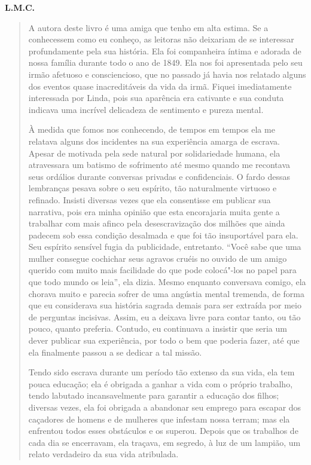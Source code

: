 \textbf{L.M.C.}

\begin{quote}
A autora deste livro é uma amiga que
tenho em alta estima. Se a conhecessem como eu conheço, as leitoras não
deixariam de se interessar profundamente pela sua história. Ela foi
companheira íntima e adorada de nossa família durante todo o ano de
1849. Ela nos foi apresentada pelo seu irmão afetuoso e consciencioso,
que no passado já havia nos relatado alguns dos eventos quase
inacreditáveis da vida da irmã. Fiquei imediatamente interessada por
Linda, pois sua aparência era cativante e sua conduta indicava uma
incrível delicadeza de sentimento e pureza mental.

À medida que fomos nos conhecendo, de
tempos em tempos ela me relatava alguns dos incidentes na sua
experiência amarga de escrava. Apesar de motivada pela sede natural por
solidariedade humana, ela atravessara um batismo de sofrimento até mesmo
quando me recontava seus ordálios durante conversas privadas e
confidenciais. O fardo dessas lembranças pesava sobre o seu espírito,
tão naturalmente virtuoso e refinado. Insisti diversas vezes que ela
consentisse em publicar sua narrativa, pois era minha opinião que esta
encorajaria muita gente a trabalhar com mais afinco pela desescravização
dos milhões que ainda padecem sob essa condição desalmada e que foi tão
insuportável para ela. Seu espírito sensível fugia da publicidade,
entretanto. ``Você sabe que uma mulher consegue cochichar seus agravos
cruéis no ouvido de um amigo querido com muito mais facilidade do que
pode colocá"-los no papel para que todo mundo os leia'', ela dizia. Mesmo
enquanto conversava comigo, ela chorava muito e parecia sofrer de uma
angústia mental tremenda, de forma que eu considerava sua história
sagrada demais para ser extraída por meio de perguntas incisivas. Assim,
eu a deixava livre para contar tanto, ou tão pouco, quanto preferia.
Contudo, eu continuava a insistir que seria um dever publicar sua
experiência, por todo o bem que poderia fazer, até que ela finalmente
passou a se dedicar a tal missão.

Tendo sido escrava durante um período
tão extenso da sua vida, ela tem pouca educação; ela é obrigada a ganhar
a vida com o próprio trabalho, tendo labutado incansavelmente para
garantir a educação dos filhos; diversas vezes, ela foi obrigada a
abandonar seu emprego para escapar dos caçadores de homens e de mulheres
que infestam nossa terram; mas ela enfrentou todos esses obstáculos e os
superou. Depois que os trabalhos de cada dia se encerravam, ela traçava,
em segredo, à luz de um lampião, um relato verdadeiro da sua vida
atribulada.


\end{quote}
